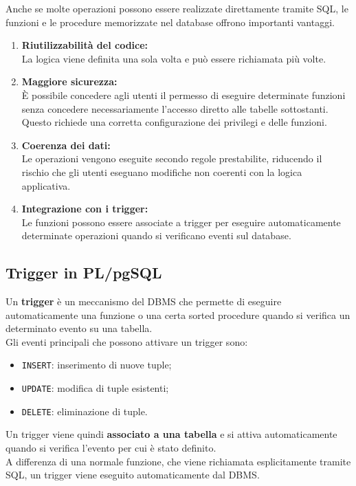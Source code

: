 Anche se molte operazioni possono essere realizzate
direttamente tramite SQL, le funzioni e le procedure
memorizzate nel database offrono importanti vantaggi.

\begin{enumerate}
    \item \textbf{Riutilizzabilità del codice:}\\
    La logica viene definita una sola volta
    e può essere richiamata più volte.

    \item \textbf{Maggiore sicurezza:}\\
    È possibile concedere agli utenti
    il permesso di eseguire determinate funzioni
    senza concedere necessariamente l'accesso
    diretto alle tabelle sottostanti.\\
    Questo richiede una corretta configurazione
    dei privilegi e delle funzioni.

    \item \textbf{Coerenza dei dati:}\\
    Le operazioni vengono eseguite secondo
    regole prestabilite, riducendo il rischio
    che gli utenti eseguano modifiche
    non coerenti con la logica applicativa.

    \item \textbf{Integrazione con i trigger:}\\
    Le funzioni possono essere associate
    a trigger per eseguire automaticamente
    determinate operazioni quando si verificano
    eventi sul database.
\end{enumerate}

\subsection{Trigger in PL/pgSQL}

Un \textbf{trigger} è un meccanismo del DBMS che permette
di eseguire automaticamente una funzione o una certa sorted procedure quando si verifica
un determinato evento su una tabella.\\
Gli eventi principali che possono attivare un trigger sono:
\begin{itemize}
    \item \texttt{INSERT}: inserimento di nuove tuple;
    \item \texttt{UPDATE}: modifica di tuple esistenti;
    \item \texttt{DELETE}: eliminazione di tuple.
\end{itemize}
\noindent
Un trigger viene quindi \textbf{associato a una tabella}
e si attiva automaticamente quando si verifica
l'evento per cui è stato definito.\\
A differenza di una normale funzione, che viene richiamata
esplicitamente tramite SQL, un trigger viene eseguito
automaticamente dal DBMS.

